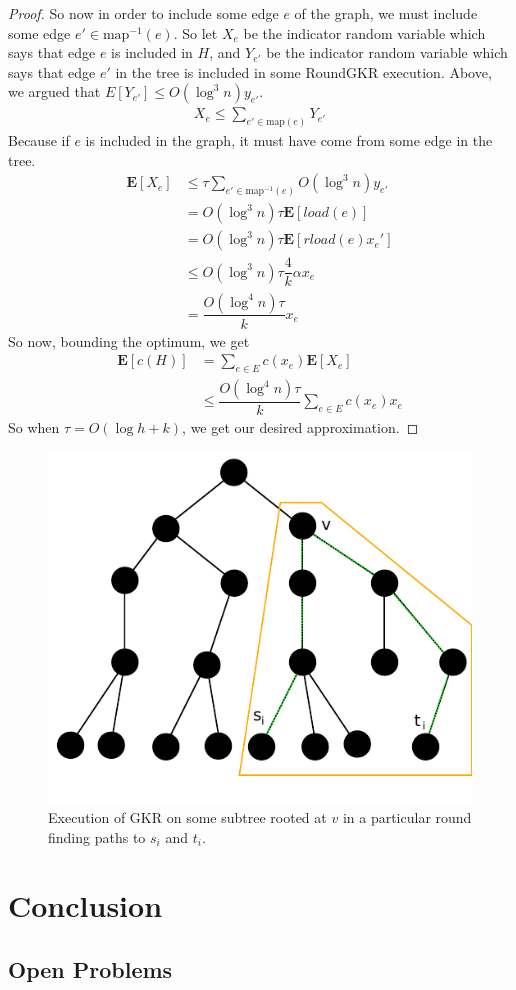 \documentclass[12pt]{article}
\begin{document}
\begin{proof}
So now in order to include some edge $e$ of the graph, we must include some edge $e' \in \text{map}^{-1}(e)$. So let $X_e$ be the indicator random variable which says that edge $e$ is included in $H$, and $Y_{e'}$ be the indicator random variable which says that edge $e'$ in the tree is included in some RoundGKR execution. Above, we argued that $E[Y_{e'}] \leq O(\log^3 n)y_{e'}$.
\begin{align}
X_e \leq \sum_{e' \in \text{map}(e)} Y_{e'}
\end{align}
Because if $e$ is included in the graph, it must have come from some edge in the tree. 
\begin{align}
 \textbf{E}[X_e] &\leq \tau \sum_{e' \in \text{map}^{-1}(e)} O(\log^3 n) y_{e'} \\
        &= O(\log^3 n) \tau \textbf{E}[load(e)] \\
        &= O(\log^3 n) \tau \textbf{E}[rload(e)x_e'] \\
        &\leq O(\log^3 n) \tau \dfrac{4}{k} \alpha x_e\\
        & = \dfrac{O(\log^4 n)\tau}{k} x_e
\end{align}
So now, bounding the optimum, we get
\begin{align}
\textbf{E}[c(H)] &= \sum_{e \in E} c(x_e)\textbf{E}[X_e] \\
                 &\leq \dfrac{O(\log^4 n)\tau}{k} \sum_{e \in E} c(x_e) x_e
\end{align}
So when $\tau = O(\log h + k)$, we get our desired approximation.
\end{proof}

\begin{figure}
\label{fig:roundgkronnode}
\centering
\includegraphics[width=\linewidth]{RoundGKRonNode.pdf}
\caption{Execution of GKR on some subtree rooted at $v$ in a particular round finding paths to $s_i$ and $t_i$.}
\end{figure}

\section{Conclusion}

\subsection{Open Problems}
\end{document}

